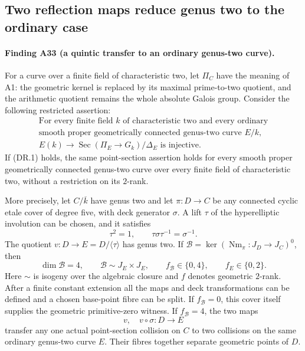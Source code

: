 \subsection{Two reflection maps reduce genus two to the ordinary case}
\label{sec:quintic-ordinary-reduction}

\paragraph{Finding A33 (a quintic transfer to an ordinary genus-two curve).}
For a curve over a finite field of characteristic two, let $\Pi_C$ have
the meaning of A1: the geometric kernel is replaced by its maximal
prime-to-two quotient, and the arithmetic quotient remains the whole
absolute Galois group.  Consider the following restricted assertion:
\[
 \begin{gathered}
 \text{For every finite field $k$ of characteristic two and every ordinary}\\
 \text{smooth proper geometrically connected genus-two curve $E/k$,}\\
 E(k)\longrightarrow\operatorname{Sec}(\Pi_E\to G_k)/\Delta_E
 \text{ is injective.}
 \end{gathered}
 \tag{DR.1}
\]
If (DR.1) holds, the same point-section assertion holds for every
smooth proper geometrically connected genus-two curve over every finite
field of characteristic two, without a restriction on its $2$-rank.

More precisely, let $C/\overline k$ have genus two and let
$\pi:D\to C$ be any connected cyclic etale cover of degree five, with
deck generator $\sigma$.  A lift $\tau$ of the hyperelliptic involution
can be chosen, and it satisfies
\[
 \tau^2=1,\qquad \tau\sigma\tau^{-1}=\sigma^{-1}.
 \tag{DR.2}
\]
The quotient $v:D\to E=D/\langle\tau\rangle$ has genus two.  If
$\mathcal B=\ker(\operatorname{Nm}_\pi:J_D\to J_C)^0$, then
\[
 \dim\mathcal B=4,\qquad
 \mathcal B\sim J_E\times J_E,\qquad
 f_{\mathcal B}\in\{0,4\},\qquad f_E\in\{0,2\}.
 \tag{DR.3}
\]
Here $\sim$ is isogeny over the algebraic closure and $f$ denotes
geometric $2$-rank.  After a finite constant extension all the maps and
deck transformations can be defined and a chosen base-point fibre can
be split.  If $f_{\mathcal B}=0$, this cover itself supplies the
geometric primitive-zero witness.  If $f_{\mathcal B}=4$, the two maps
\[
                         v,\quad v\circ\sigma:D\longrightarrow E
 \tag{DR.4}
\]
transfer any one actual point-section collision on $C$ to two collisions
on the same ordinary genus-two curve $E$.  Their fibres together
separate geometric points of $D$.

